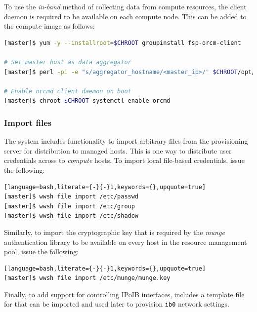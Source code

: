 \documentclass[letterpaper]{article}
\begin{document}
To use the {\em in-band} method of collecting data from compute resources, the
\ORCM{} client daemon is required to be available on each compute node. This can
be added to the compute image as follows:

\begin{lstlisting}[language=bash,keywords={},upquote=true]
[master]$ yum -y --installroot=$CHROOT groupinstall fsp-orcm-client

# Set master host as data aggregator
[master]$ perl -pi -e "s/aggregator_hostname/<master_ip>/" $CHROOT/opt/open-rcm/etc/orcm-site.xml

# Enable orcmd client daemon on boot
[master]$ chroot $CHROOT systemctl enable orcmd
\end{lstlisting}

\subsubsection{Import files} \label{sec:file_import}

The \Warewulf{} system includes functionality to import arbitrary files from the
provisioning server for distribution to managed hosts. This is one way
to distribute user credentials across to {\em compute} hosts. To
import local file-based credentials, issue the following:

\begin{lstlisting}[language=bash,literate={-}{-}1,keywords={},upquote=true]
[master]$ wwsh file import /etc/passwd                                                                                                       
[master]$ wwsh file import /etc/group
[master]$ wwsh file import /etc/shadow 
\end{lstlisting}

Similarly, to import the cryptographic key that is required by the {\em munge}
authentication library to be available on every host in the resource management
pool, issue the following:

\begin{lstlisting}[language=bash,literate={-}{-}1,keywords={},upquote=true]
[master]$ wwsh file import /etc/munge/munge.key
\end{lstlisting}

Finally, to add support for controlling IPoIB interfaces, \FSP{} includes a
template file for \Warewulf{} that can be imported and used later to provision
\texttt{ib0} network settings.
\end{document}
